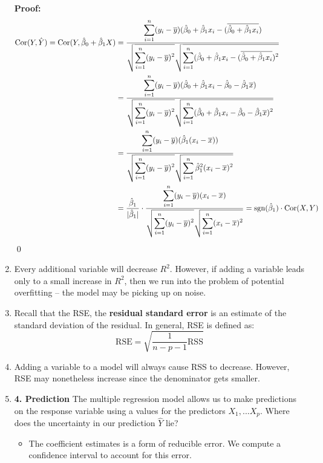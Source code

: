 \documentclass[10pt]{article}
\newcommand{\Cor}{{\rm Cor}}
\begin{document}
\begin{enumerate}
{	\noindent \textbf{Proof:} 
	\begin{align*}
	\Cor(Y, \hat Y) = \Cor(Y, \hat \beta_0 + \hat \beta_1 X) &= \dfrac{\displaystyle\sum_{i = 1}^n (y_i - \overline{y}) (\hat\beta_0 + \hat\beta_1 x_i - (\overline{\hat\beta_0 + \hat\beta_1 x_i})}
	{\sqrt{\displaystyle \sum_{i =1}^n (y_i - \overline{y})^2}\sqrt{\displaystyle\sum_{i = 1}^n (\hat\beta_0 + \hat\beta_1x_i - (\overline{\hat \beta_0 + \hat\beta_1 x_i})^2}} \\
	&= \dfrac{\displaystyle\sum_{i = 1}^n (y_i - \overline{y}) (\hat\beta_0 + \hat\beta_1 x_i - \hat\beta_0 - \hat\beta_1 \overline{x})}
	{\sqrt{\displaystyle \sum_{i =1}^n (y_i - \overline{y})^2}\sqrt{\displaystyle\sum_{i = 1}^n (\hat\beta_0 + \hat\beta_1x_i - \hat \beta_0 - \hat\beta_1 \overline{x})^2}}\\
	&= \dfrac{\displaystyle\sum_{i = 1}^n (y_i - \overline{y}) (\hat\beta_1 (x_i - \overline{x}))}
	{\sqrt{\displaystyle \sum_{i =1}^n (y_i - \overline{y})^2}\sqrt{\displaystyle\sum_{i = 1}^n  \hat\beta_1^2(x_i - \overline{x})^2}} \\
	&= \dfrac{\hat\beta_1}{|\hat\beta_1|} \cdot \dfrac{\displaystyle\sum_{i = 1}^n (y_i - \overline{y}) (x_i - \overline{x})}
	{\sqrt{\displaystyle \sum_{i =1}^n (y_i - \overline{y})^2}\sqrt{\displaystyle\sum_{i = 1}^n  (x_i - \overline{x})^2}} = \text{sgn}(\hat\beta_1) \cdot \Cor(X,Y)
	\end{align*}
	\qed 
	}
	\item Every additional variable will decrease $R^2$. However, if adding a variable leads only to a small increase in $R^2$, then we run into the problem of potential overfitting -- the model may be picking up on noise.
	\item Recall that the RSE, the \textbf{residual standard error} is an estimate of the standard deviation of the residual.  In general, RSE is defined as:
	$$\text{RSE} = \sqrt{\dfrac{1}{n - p -1 } \text{RSS}}$$
	\item Adding a variable to a model will always cause RSS to decrease.  However, RSE may nonetheless increase since the denominator gets smaller.
	\item \textbf{4. Prediction} The multiple regression model allows us to make predictions on the response variable using a values for the predictors $X_1, ... X_p$.  Where does the uncertainty in our prediction $\hat Y$ lie?
	\begin{itemize} 
	\item The coefficient estimates is a form of reducible error.  We compute a confidence interval to account for this error.

\end{itemize}
\end{enumerate}
\end{document}
